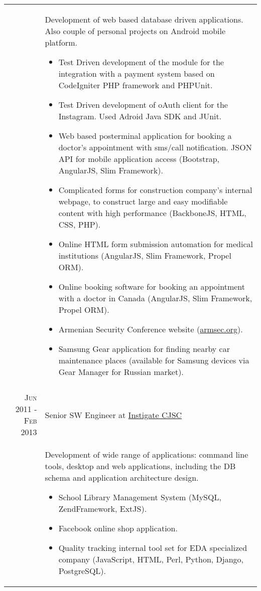 \documentclass[a4paper,10pt]{article}
\begin{document}
\begin{tabular}{r|p{11cm}}
& \footnotesize{ Development of web based database driven applications. Also couple of personal projects on Android mobile platform.
  \begin{itemize}
    \item Test Driven development of the module for the integration with a
          payment system based on CodeIgniter PHP framework and PHPUnit.
    \item Test Driven development of oAuth client for the Instagram. Used
          Adroid Java SDK and JUnit.
    \item Web based posterminal application for booking a doctor's appointment
          with sms/call notification. JSON API for mobile application access
          (Bootstrap, AngularJS, Slim Framework).
    \item Complicated forms for construction company's internal webpage, to
          construct large and easy modifiable content with high performance
          (BackboneJS, HTML, CSS, PHP).
    \item Online HTML form submission automation for medical institutions
          (AngularJS, Slim Framework, Propel ORM).
    \item Online booking software for booking an appointment with a doctor in
          Canada (AngularJS, Slim Framework, Propel ORM).
    \item Armenian Security Conference website
          (\href{http://www.armsec.org}{armsec.org}).
    \item Samsung Gear application for finding nearby car maintenance places
          (available for Samsung devices via Gear Manager for Russian market).
  \end{itemize} 
} \\


\multicolumn{2}{c}{} \\


\textsc{Jun 2011 - Feb 2013} 
  & Senior SW Engineer at
    \href{http://www.instigatedesign.com/}{Instigate CJSC} \\

& \footnotesize{ Development of wide range of applications: command line tools,
desktop and web applications, including the DB schema and application
architecture design.
  \begin{itemize}
    \item School Library Management System (MySQL, ZendFramework, ExtJS).
    \item Facebook online shop application.
    \item Quality tracking internal tool set for EDA specialized company
          (JavaScript, HTML, Perl, Python, Django, PostgreSQL).
  \end{itemize} 
} \\




\end{tabular}
\end{document}
